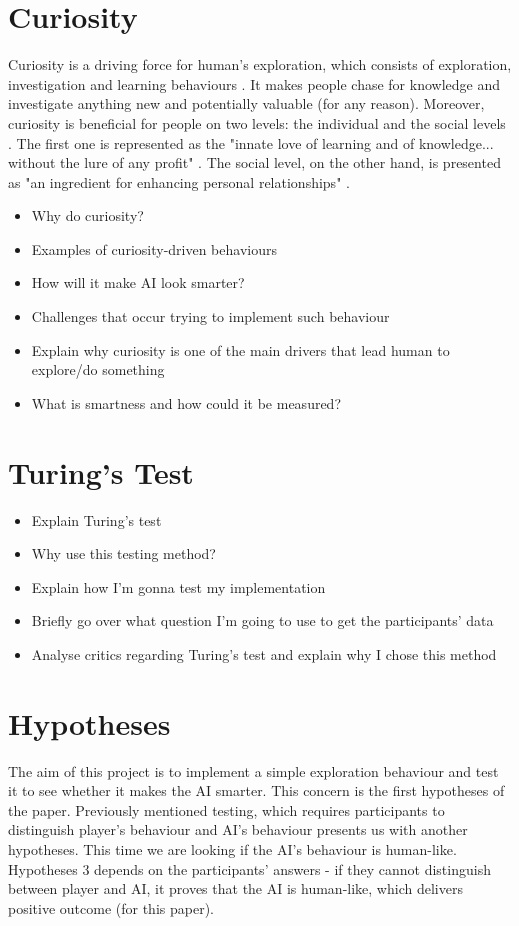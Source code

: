 \documentclass[journal]{IEEEtran}
\begin{document}
\section{Curiosity}
Curiosity is a driving force for human's exploration, which consists of exploration, investigation and learning behaviours \cite{wu2013curiosity} \cite{kashdan2004curiosity}. It makes people chase for knowledge and investigate anything new and potentially valuable (for any reason). Moreover, curiosity is beneficial for people on two levels: the individual and the social levels \cite{kashdan2010curiosity}. The first one is represented as the "innate love of learning and of knowledge... without the lure of any profit" \cite{loewenstein1994psychology}. The social level, on the other hand, is presented as "an ingredient for enhancing personal relationships" \cite{wu2013curiosity}.
\begin{itemize}
	\item Why do curiosity?
	\item Examples of curiosity-driven behaviours
	\item How will it make AI look smarter?
	\item Challenges that occur trying to implement such behaviour
	\item Explain why curiosity is one of the main drivers that lead human to explore/do something
	\item What is smartness and how could it be measured?
\end{itemize}

\section{Turing's Test}
\begin{itemize}
	\item Explain Turing's test
	\item Why use this testing method?
	\item Explain how I'm gonna test my implementation
	\item Briefly go over what question I'm going to use to get the participants' data
	\item Analyse critics regarding Turing's test and explain why I chose this method
\end{itemize}

\section{Hypotheses}
The aim of this project is to implement a simple exploration behaviour and test it to see whether it makes the AI smarter. This concern is the first hypotheses of the paper. Previously mentioned testing, which requires participants to distinguish player's behaviour and AI's behaviour presents us with another hypotheses. This time we are looking if the AI's behaviour is human-like. Hypotheses 3 depends on the participants' answers - if they cannot distinguish between player and AI, it proves that the AI is human-like, which delivers positive outcome (for this paper).
\end{document}
